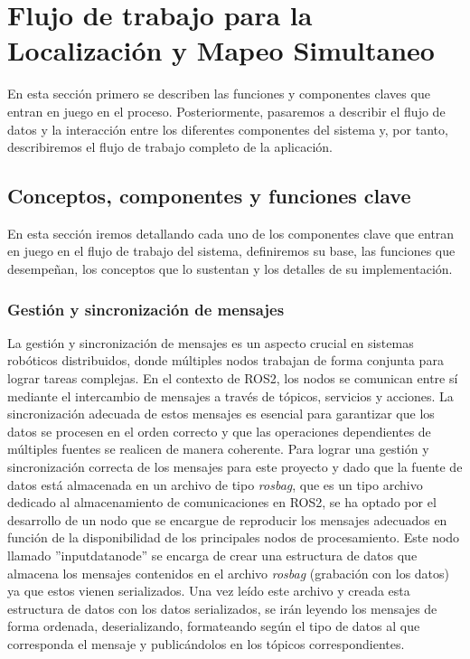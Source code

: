 \documentclass[12pt, a4paper, twoside]{article}
\begin{document}
\section{Flujo de trabajo para la Localización y Mapeo Simultaneo}

En esta sección primero se describen las funciones y componentes claves que entran en juego en el proceso. Posteriormente, pasaremos a 
describir el flujo de datos y la interacción entre los diferentes componentes del sistema y, por tanto, describiremos el flujo de trabajo 
completo de la aplicación.

\subsection{Conceptos, componentes y funciones clave}
En esta sección iremos detallando cada uno de los componentes clave que entran en juego en el flujo de trabajo del sistema, definiremos su base,
las funciones que desempeñan, los conceptos que lo sustentan y los detalles de su implementación.

\subsubsection{Gestión y sincronización de mensajes}
La gestión y sincronización de mensajes es un aspecto crucial en sistemas robóticos distribuidos, donde múltiples nodos trabajan de forma 
conjunta para lograr tareas complejas. En el contexto de ROS2\cite{doi:10.1126/scirobotics.abm6074}, los nodos se comunican entre sí mediante el intercambio de mensajes a
través de tópicos, servicios y acciones. La sincronización adecuada de estos mensajes es esencial para garantizar que los datos se procesen 
en el orden correcto y que las operaciones dependientes de múltiples fuentes se realicen de manera coherente. \newline
Para lograr una gestión y sincronización correcta de los mensajes para este proyecto y dado que la fuente de datos está almacenada en un 
archivo de tipo \textit{\textit{rosbag}}, que es un tipo archivo dedicado al almacenamiento de comunicaciones en ROS2\cite{doi:10.1126/scirobotics.abm6074}, 
se ha optado por el desarrollo de un nodo que se encargue de reproducir los mensajes adecuados en función de la disponibilidad de los principales nodos de procesamiento.\newline
Este nodo llamado ''input\textunderscore data\textunderscore node'' se encarga de crear una estructura de datos que almacena los mensajes contenidos 
en el archivo \textit{rosbag} (grabación con los datos) ya que estos vienen serializados. Una vez leído este archivo y creada esta estructura de datos con los 
datos serializados, se irán leyendo los mensajes de forma ordenada, deserializando, formateando según el tipo de datos al que corresponda el mensaje 
y publicándolos en los tópicos correspondientes.
\end{document}
